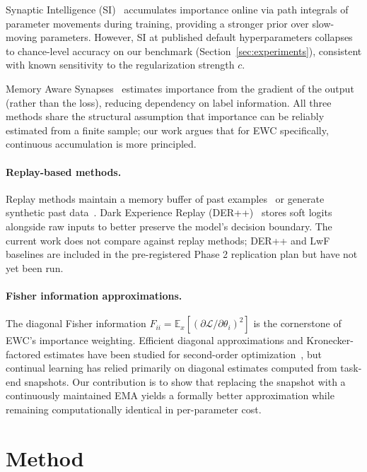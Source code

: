 \documentclass[10pt,letterpaper]{article}
\newcommand{\EWC}{\textsc{EWC}}
\newcommand{\SI}{\textsc{SI}}
\begin{document}
Synaptic Intelligence (\SI{})~\cite{Zenke2017} accumulates importance online via
path integrals of parameter movements during training, providing a stronger prior
over slow-moving parameters.
However, \SI{} at published default hyperparameters collapses to chance-level
accuracy on our benchmark (Section~\ref{sec:experiments}), consistent with known
sensitivity to the regularization strength $c$.

Memory Aware Synapses~\cite{Aljundi2018} estimates importance from the gradient
of the output (rather than the loss), reducing dependency on label information.
All three methods share the structural assumption that importance can be reliably
estimated from a finite sample; our work argues that for EWC specifically,
continuous accumulation is more principled.

\paragraph{Replay-based methods.}
Replay methods maintain a memory buffer of past examples~\cite{Rebuffi2017,LopezPaz2017}
or generate synthetic past data~\cite{Shin2017}.
Dark Experience Replay (DER++)~\cite{Buzzega2020} stores soft logits alongside raw
inputs to better preserve the model's decision boundary.
The current work does not compare against replay methods; DER++ and LwF baselines
are included in the pre-registered Phase 2 replication plan but have not yet been run.

\paragraph{Fisher information approximations.}
The diagonal Fisher information $F_{ii} = \mathbb{E}_{x}[(\partial \mathcal{L}/\partial\theta_i)^2]$
is the cornerstone of \EWC{}'s importance weighting.
Efficient diagonal approximations and Kronecker-factored estimates have been
studied for second-order optimization~\cite{Martens2015}, but continual learning
has relied primarily on diagonal estimates computed from task-end snapshots.
Our contribution is to show that replacing the snapshot with a continuously maintained
EMA yields a formally better approximation while remaining computationally identical
in per-parameter cost.

\section{Method}
\label{sec:method}
\end{document}

